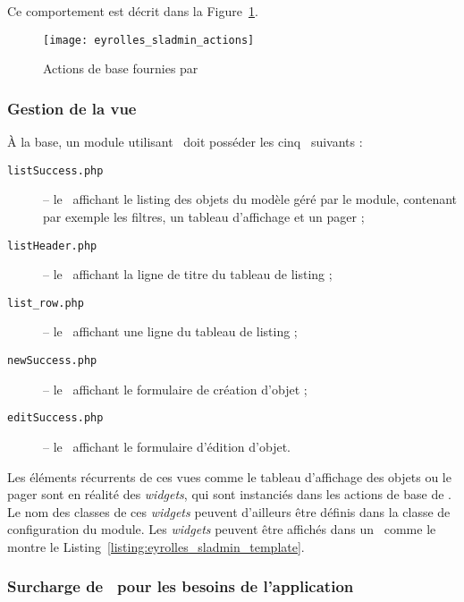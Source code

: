 Ce comportement est décrit dans la Figure~\ref{figure:eyrolles_sladmin_actions}.

\begin{figure}
	\centering
	\texttt{[image: eyrolles\_sladmin\_actions]}
	\caption{Actions de base fournies par \asladmin}
	\label{figure:eyrolles_sladmin_actions}
\end{figure}


\subsubsection{Gestion de la vue}
\label{section:eyrolles_sladmin_view}

À la base, un module utilisant \asladmin\ doit posséder les cinq \atemplates\ suivants :
\begin{description}
	\item[\texttt{listSuccess.php}] -- le \atemplate\ affichant le listing des objets du modèle géré par le module, contenant par exemple les filtres, un tableau d'affichage et un pager ;
	\item[\texttt{listHeader.php}] -- le \apartial\ affichant la ligne de titre du tableau de listing ;
	\item[\texttt{list\_row.php}] -- le \apartial\ affichant une ligne du tableau de listing ;
	\item[\texttt{newSuccess.php}] -- le \atemplate\ affichant le formulaire de création d'objet ;
	\item[\texttt{editSuccess.php}] -- le \atemplate\ affichant le formulaire d'édition d'objet.
\end{description}

Les éléments récurrents de ces vues comme le tableau d'affichage des objets ou le pager sont en réalité des \textit{widgets}, qui sont instanciés dans les actions de base de \asladmin. Le nom des classes de ces \textit{widgets} peuvent d'ailleurs être définis dans la classe de configuration du module. Les \textit{widgets} peuvent être affichés dans un \atemplate\ comme le montre le Listing~\ref{listing:eyrolles_sladmin_template}.




\subsubsection{Surcharge de \asladmin\ pour les besoins de l'application}

